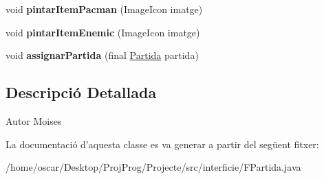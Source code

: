 \begin{DoxyCompactItemize}
\item 
\hypertarget{classinterficie_1_1_f_partida_aaaa9cf72ac9c6e237d13e823d20bcb93}{void {\bfseries pintar\+Item\+Pacman} (Image\+Icon imatge)}\label{classinterficie_1_1_f_partida_aaaa9cf72ac9c6e237d13e823d20bcb93}

\item 
\hypertarget{classinterficie_1_1_f_partida_a5b079601d2de0f3a1234d4e61fc8460c}{void {\bfseries pintar\+Item\+Enemic} (Image\+Icon imatge)}\label{classinterficie_1_1_f_partida_a5b079601d2de0f3a1234d4e61fc8460c}

\item 
\hypertarget{classinterficie_1_1_f_partida_a4171c2e25f5868e1422cccf7f8018dbc}{void {\bfseries assignar\+Partida} (final \hyperlink{classlogica_1_1_partida}{Partida} partida)}\label{classinterficie_1_1_f_partida_a4171c2e25f5868e1422cccf7f8018dbc}

\end{DoxyCompactItemize}


\subsection{Descripció Detallada}
\begin{DoxyAuthor}{Autor}
Moises 
\end{DoxyAuthor}


La documentació d'aquesta classe es va generar a partir del següent fitxer\+:\begin{DoxyCompactItemize}
\item 
/home/oscar/\+Desktop/\+Proj\+Prog/\+Projecte/src/interficie/F\+Partida.\+java\end{DoxyCompactItemize}
